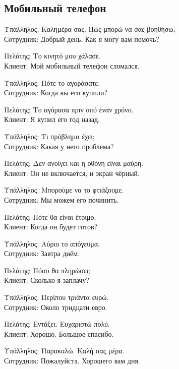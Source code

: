 \documentclass[12pt]{article}
\newcommand{\my}[1]{\textcolor{gray!80!white}{#1}}
\newenvironment{page}{\clearpage\normalsize\null\vfill}{\vfill\null}
\newenvironment{textblock}{\begin{minipage}{\textwidth}}{\end{minipage}\smallskip}
\newcommand{\dialogright}[2]{%
	\par\begingroup\raggedleft
	#1\\
	\my{#2}\par
	\endgroup
}
\begin{document}
	\begin{page}
		\subsection{Мобильный телефон}
		\scriptsize
		\begin{textblock}
			Υπάλληλος: Καλημέρα σας. Πώς μπορώ να σας βοηθήσω;\\
			\my{Сотрудник: Добрый день. Как я могу вам помочь?}
			
			\dialogright{Πελάτης: Το κινητό μου χάλασε.}{Клиент: Мой мобильный телефон сломался.}
			
			Υπάλληλος: Πότε το αγοράσατε;\\
			\my{Сотрудник: Когда вы его купили?}
			
			\dialogright{Πελάτης: Το αγόρασα πριν από έναν χρόνο.}{Клиент: Я купил его год назад.}
			
			Υπάλληλος: Τι πρόβλημα έχει;\\
			\my{Сотрудник: Какая у него проблема?}
			
			\dialogright{Πελάτης: Δεν ανοίγει και η οθόνη είναι μαύρη.}{Клиент: Он не включается, и экран чёрный.}
			
			Υπάλληλος: Μπορούμε να το φτιάξουμε.\\
			\my{Сотрудник: Мы можем его починить.}
			
			\dialogright{Πελάτης: Πότε θα είναι έτοιμο;}{Клиент: Когда он будет готов?}
			
			Υπάλληλος: Αύριο το απόγευμα.\\
			\my{Сотрудник: Завтра днём.}
			
			\dialogright{Πελάτης: Πόσο θα πληρώσω;}{Клиент: Сколько я заплачу?}
			
			Υπάλληλος: Περίπου τριάντα ευρώ.\\
			\my{Сотрудник: Около тридцати евро.}
			
			\dialogright{Πελάτης: Εντάξει. Ευχαριστώ πολύ.}{Клиент: Хорошо. Большое спасибо.}
			
			Υπάλληλος: Παρακαλώ. Καλή σας μέρα.\\
			\my{Сотрудник: Пожалуйста. Хорошего вам дня.}
		\end{textblock}
	\end{page}
\end{document}
